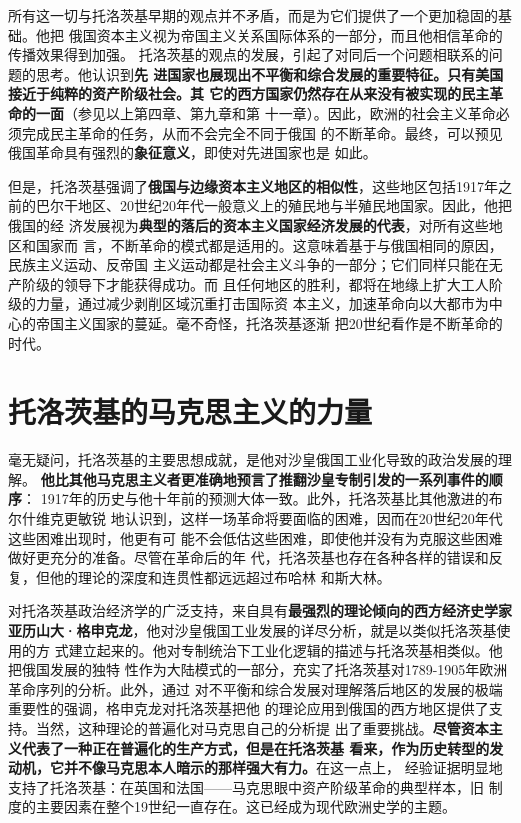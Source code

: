所有这一切与托洛茨基早期的观点并不矛盾，而是为它们提供了一个更加稳固的基础。他把
俄国资本主义视为帝国主义关系国际体系的一部分，而且他相信革命的传播效果得到加强。
托洛茨基的观点的发展，引起了对同后一个问题相联系的问题的思考。他认识到\textbf{先
  进国家也展现出不平衡和综合发展的重要特征。只有美国接近于纯粹的资产阶级社会。其
  它的西方国家仍然存在从来没有被实现的民主革命的一面}（参见以上第四章、第九章和第
十一章）。因此，欧洲的社会主义革命必须完成民主革命的任务，从而不会完全不同于俄国
的不断革命。最终，可以预见俄国革命具有强烈的\textbf{象征意义}，即使对先进国家也是
如此。

但是，托洛茨基强调了\textbf{俄国与边缘资本主义地区的相似性}，这些地区包括1917年之
前的巴尔干地区、20世纪20年代一般意义上的殖民地与半殖民地国家。因此，他把俄国的经
济发展视为\textbf{典型的落后的资本主义国家经济发展的代表}，对所有这些地区和国家而
言，不断革命的模式都是适用的。这意味着基于与俄国相同的原因，民族主义运动、反帝国
主义运动都是社会主义斗争的一部分；它们同样只能在无产阶级的领导下才能获得成功。而
且任何地区的胜利，都将在地缘上扩大工人阶级的力量，通过减少剥削区域沉重打击国际资
本主义，加速革命向以大都市为中心的帝国主义国家的蔓延。毫不奇怪，托洛茨基逐渐
把20世纪看作是不断革命的时代。

\section{托洛茨基的马克思主义的力量}

毫无疑问，托洛茨基的主要思想成就，是他对沙皇俄国工业化导致的政治发展的理解。
\textbf{他比其他马克思主义者更准确地预言了推翻沙皇专制引发的一系列事件的顺序}：
1917年的历史与他十年前的预测大体一致。此外，托洛茨基比其他激进的布尔什维克更敏锐
地认识到，这样一场革命将要面临的困难，因而在20世纪20年代这些困难出现时，他更有可
能不会低估这些困难，即使他并没有为克服这些困难做好更充分的准备。尽管在革命后的年
代，托洛茨基也存在各种各样的错误和反复，但他的理论的深度和连贯性都远远超过布哈林
和斯大林。

对托洛茨基政治经济学的广泛支持，来自具有\textbf{最强烈的理论倾向的西方经济史学家
  亚历山大·格申克龙}，他对沙皇俄国工业发展的详尽分析，就是以类似托洛茨基使用的方
式建立起来的。他对专制统治下工业化逻辑的描述与托洛茨基相类似。他把俄国发展的独特
性作为大陆模式的一部分，充实了托洛茨基对1789-1905年欧洲革命序列的分析。此外，通过
对不平衡和综合发展对理解落后地区的发展的极端重要性的强调，格申克龙对托洛茨基把他
的理论应用到俄国的西方地区提供了支持。当然，这种理论的普遍化对马克思自己的分析提
出了重要挑战。\textbf{尽管资本主义代表了一种正在普遍化的生产方式，但是在托洛茨基
  看来，作为历史转型的发动机，它并不像马克思本人暗示的那样强大有力。}在这一点上，
经验证据明显地支持了托洛茨基：在英国和法国——马克思眼中资产阶级革命的典型样本，旧
制度的主要因素在整个19世纪一直存在。这已经成为现代欧洲史学的主题。

